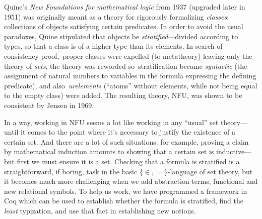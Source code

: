 \documentclass[bsl,meeting]{asl}
\newcommand{\NP}{}
\begin{document}
\thispagestyle{empty}


\NP  
{}


Quine's \emph{New Foundations for mathematical logic} from 1937 (upgraded later in 1951) was originally meant as a theory for rigorously formalizing \emph{classes}: collections of objects satisfying certain predicates. In order to avoid the usual paradoxes, Quine stipulated that objects be \emph{stratified}---divided according to types, so that a class is of a higher type than its elements. In search of consistency proof, \textbullet\,proper classes were expelled (to metatheory) leaving only the theory of \emph{sets}, the theory was reworded so \textbullet\,stratification became \emph{syntactic} (the assignment of natural numbers to variables in the formula expressing the defining predicate), and also \textbullet\,\emph{urelements} (``atoms'' without elements, while not being equal to the empty class) were added. The resulting theory, \textsf{NFU}, was shown to be consistent by Jensen in 1969.

In a way, working in \textsf{NFU} seems a lot like working in any ``usual'' set theory---until it comes to the point where it's necessary to justify the existence of a certain set. And there are a lot of such situations: for example, proving a claim by mathematical induction amounts to showing that a certain set is inductive---but first we must ensure it is a set. Checking that a formula is stratified is a straightforward, if boring, task in the basic $\{\in,=\}$-language of set theory, but it becomes much more challenging when we add abstraction terms, functional and new relational symbols. To help us work, we have programmed a framework in Coq which can be used to establish whether the formula is stratified, find the \emph{least} typization, and use that fact in establishing new notions.

\vspace*{-0.5\baselineskip}
\end{document}
